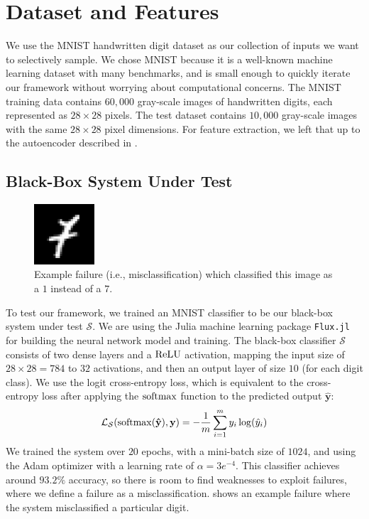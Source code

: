 \section{Dataset and Features}
We use the MNIST handwritten digit dataset \citep{deng2012mnist} as our collection of inputs we want to selectively sample.
We chose MNIST because it is a well-known machine learning dataset with many benchmarks, and is small enough to quickly iterate our framework without worrying about computational concerns.
The MNIST training data contains $60{,}000$ gray-scale images of handwritten digits, each represented as $28\times28$ pixels. The test dataset contains $10{,}000$ gray-scale images with the same $28\times28$ pixel dimensions. For feature extraction, we left that up to the autoencoder described in .



\subsection{Black-Box System Under Test}
\begin{figure}
  \vspace{-30pt}
  \centering
  \centerline{\includegraphics[width=0.2\textwidth]{figures/weakness_rec/MNIST-failure-7(1).png}}
  \caption{Example failure (i.e., misclassification) which classified this image as a $1$ instead of a $7$.}
  \label{fig:mnist_nn_failure}
\end{figure}
To test our framework, we trained an MNIST classifier to be our black-box system under test $\mathcal{S}$.
We are using the Julia machine learning package \texttt{Flux.jl} \citep{innes:2018} for building the neural network model and training.
The black-box classifier $\mathcal{S}$ consists of two dense layers and a $\operatorname{ReLU}$ activation, mapping the input size of $28\times28=784$ to $32$ activations, and then an output layer of size $10$ (for each digit class).
We use the logit cross-entropy loss, which is equivalent to the cross-entropy loss after applying the $\operatorname{softmax}$ function to the predicted output $\mathbf{\hat y}$:
\begin{equation*}
\mathcal{L}_\mathcal{S}(\operatorname{softmax}(\mathbf{\hat y}), \mathbf{y}) = -\frac{1}{m} \sum_{i=1}^m y_i \log(\hat y_i)
\end{equation*}
We trained the system over $20$ epochs, with a mini-batch size of $1024$, and using the Adam optimizer \citep{kingma2017adam} with a learning rate of $\alpha=3e^{-4}$. This classifier achieves around $93.2\%$ accuracy, so there is room to find weaknesses to exploit failures, where we define a failure as a misclassification.
 shows an example failure where the system misclassified a particular digit.




